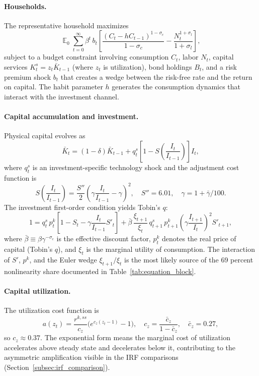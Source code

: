 \documentclass[12pt]{article}
\theoremstyle{plain}
\theoremstyle{definition}
\theoremstyle{remark}
\DeclareMathOperator{\E}{\mathbb{E}}
\begin{document}
\paragraph{Households.} The representative household maximizes
\[
\E_0 \sum_{t=0}^\infty \beta^t \, b_t \left[ \frac{(C_t - h C_{t-1})^{1-\sigma_c}}{1-\sigma_c} - \frac{N_t^{1+\sigma_l}}{1+\sigma_l} \right],
\]
subject to a budget constraint involving consumption $C_t$, labor $N_t$, capital services $K_t^s = z_t \bar{K}_{t-1}$ (where $z_t$ is utilization), bond holdings $B_t$, and a risk premium shock $b_t$ that creates a wedge between the risk-free rate and the return on capital. The habit parameter $h$ generates the consumption dynamics that interact with the investment channel.

\paragraph{Capital accumulation and investment.} Physical capital evolves as
\[
\bar{K}_t = (1-\delta)\bar{K}_{t-1} + q_t^s \left[1 - S\!\left(\frac{I_t}{I_{t-1}}\right)\right] I_t,
\]
where $q_t^s$ is an investment-specific technology shock and the adjustment cost function is
\[
S\!\left(\frac{I_t}{I_{t-1}}\right) = \frac{S''}{2}\left(\gamma \frac{I_t}{I_{t-1}} - \gamma\right)^2, \quad S'' = 6.01, \quad \gamma = 1 + \bar{\gamma}/100.
\]
The investment first-order condition yields Tobin's $q$:
\[
1 = q_t^s \, p_t^k \!\left[1 - S_t - \gamma \frac{I_t}{I_{t-1}} S'_t\right] + \bar{\beta}\,\frac{\xi_{t+1}}{\xi_t}\,q_{t+1}^s \, p_{t+1}^k \left(\gamma \frac{I_{t+1}}{I_t}\right)^2 S'_{t+1},
\]
where $\bar{\beta} \equiv \beta \gamma^{-\sigma_c}$ is the effective discount factor, $p_t^k$ denotes the real price of capital (Tobin's $q$), and $\xi_t$ is the marginal utility of consumption. The interaction of $S'$, $p^k$, and the Euler wedge $\xi_{t+1}/\xi_t$ is the most likely source of the 69 percent nonlinearity share documented in Table~\ref{tab:equation_block}.

\paragraph{Capital utilization.} The utilization cost function is
\[
a(z_t) = \frac{r^{k,ss}}{c_z}\bigl(e^{c_z(z_t - 1)} - 1\bigr), \quad c_z = \frac{\bar{c}_z}{1 - \bar{c}_z}, \quad \bar{c}_z = 0.27,
\]
so $c_z \approx 0.37$. The exponential form means the marginal cost of utilization accelerates above steady state and decelerates below it, contributing to the asymmetric amplification visible in the IRF comparisons (Section~\ref{subsec:irf_comparison}).
\end{document}
